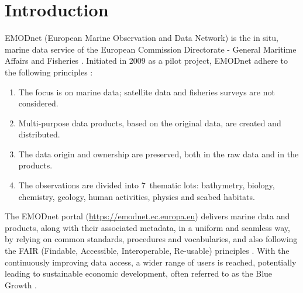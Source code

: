 \documentclass[essd,manuscript]{copernicus}
\begin{document}
\section{Introduction}

EMODnet (European Marine Observation and Data Network) is the in situ, marine data service of the European Commission Directorate - General Maritime Affairs and Fisheries \citep{MartinMiguez2019}. Initiated in 2009 as a pilot project, EMODnet adhere to the following principles \citep{Shepherd2018}: 
\begin{enumerate}
\item The focus is on marine data; satellite data and fisheries surveys are not considered. 
\item Multi-purpose data products, based on the original data, are created and distributed. 
\item The data origin and ownership are preserved, both in the raw data and in the products. 
\item The observations are divided into 7~thematic lots: bathymetry, biology, chemistry, geology, human activities, physics and seabed habitats. 
\end{enumerate} 

The EMODnet portal (\url{https://emodnet.ec.europa.eu}) delivers marine data and products, along with their associated metadata, in a uniform and seamless way, by relying on common standards, procedures and vocabularies, and also following the FAIR (Findable, Accessible, Interoperable, Re-usable) principles \citep {Wilkinson2016,Wilkinson2019}. With the continuously improving data access, a wider range of users is reached, potentially leading to sustainable economic development, often referred to as the Blue Growth \citep{Commission2012}. 
\end{document}
